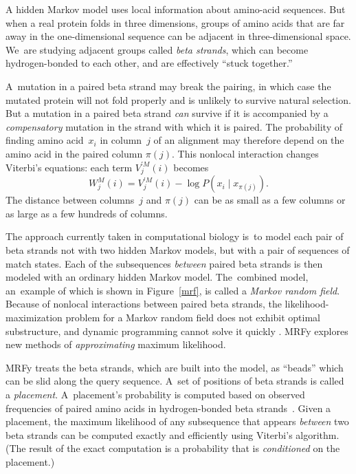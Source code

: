 \documentclass[nonatbib]{sigplanconf}
\newcommand\pairedwith[1]{{\pi(#1)}}
\newcommand\figref[1]{Figure~\ref{#1}}
\let\cite\citep
\begin{document}
A hidden Markov model uses local information about
amino-acid sequences.
But when a real protein folds in three dimensions, 
groups of amino acids 
that are far away in the one-dimensional sequence can be
adjacent in three-dimensional space.
We~are studying adjacent groups called \emph{beta strands}, which
can become hydrogen-bonded to each other,
and are effectively ``stuck together.''

A~mutation in a paired beta strand may break the pairing, in which
 case the mutated protein will not fold properly and is unlikely to
 survive natural selection.
But a mutation in a paired beta strand \emph{can} survive if it is
 accompanied by a \emph{compensatory} mutation in the strand with which it is
 paired. 
The probability of finding amino acid~$x_i$ in column~$j$ of an alignment may
 therefore depend on the amino acid in the paired column
 $\pairedwith j$.
This nonlocal interaction changes
Viterbi's equations:
each term $V_{j}^{\prime M}(i)$ becomes
$$W_{j}^{M}(i) = V_{j}^{\prime M}(i) - \log P(x_{i} \mid x_{\pairedwith j}).$$
The distance between columns~$j$ and $\pairedwith j$ can be as small
 as a few columns or as large as a few hundreds of columns.


The approach currently taken in computational biology
is~to model each pair of beta strands not with two hidden Markov
models, 
but with a pair of sequences of match states.
Each of the subsequences \emph{between} paired beta strands is then
modeled with an ordinary hidden Markov model.
The~combined model, an~example of which is shown in \figref{mrf}, is called a
\textit{Markov random field}. 
Because of nonlocal interactions between paired beta strands, 
the likelihood-maximization problem for a Markov random field does not
 exhibit optimal substructure, and dynamic
 programming cannot solve it quickly \cite{Menke:2010ti,Daniels:2012}.
MRFy explores new methods of \emph{approximating}
maximum likelihood.




MRFy treats the beta 
strands, which are built into the model,
 as ``beads'' which can be slid along the query sequence.
A~set of positions of beta strands is called
 a \emph{placement}.
A~placement's probability is computed
based on observed frequencies of paired amino acids in 
hydrogen-bonded beta strands~\cite{Cowen:2002p588}.
Given a placement, the maximum likelihood of any subsequence that appears
\emph{between} two beta strands can be computed exactly and
efficiently using Viterbi's algorithm.
(The result of the exact computation is a probability that is
\emph{conditioned} on the placement.)
\end{document}
